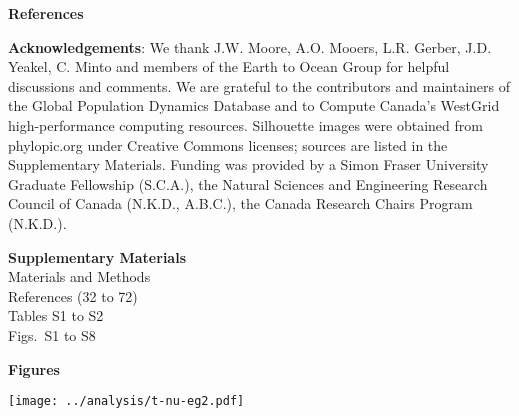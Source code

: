 \textbf{References}

\renewcommand{\section}[2]{}%



\textbf{Acknowledgements}: We thank J.W. Moore, A.O. Mooers, L.R. Gerber, J.D. Yeakel, C. Minto and members of the Earth to Ocean Group for helpful discussions and comments. We are grateful to the contributors and maintainers of the Global Population Dynamics Database and to Compute Canada's WestGrid high-performance computing resources. Silhouette images were obtained from phylopic.org under Creative Commons licenses; sources are listed in the Supplementary Materials. Funding was provided by a Simon Fraser University Graduate Fellowship (S.C.A.), the Natural Sciences and Engineering Research Council of Canada (N.K.D., A.B.C.), the Canada Research Chairs Program (N.K.D.).

\textbf{Supplementary Materials}\\
Materials and Methods\\
References (32 to 72)\\
Tables S1 to S2\\
Figs.~S1 to S8\\



\clearpage

\textbf{Figures}

\begin{center}
\texttt{[image: ../analysis/t-nu-eg2.pdf]}
\end{center}

